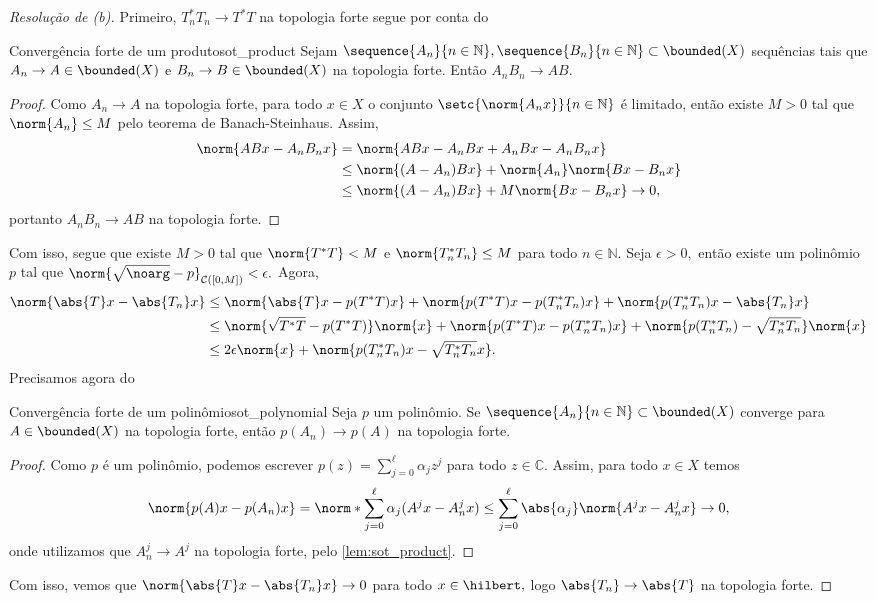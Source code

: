 \begin{proof}[Resolução de (b)]
  Primeiro, \(T_n^*T_n \to T^*T\) na topologia forte segue por conta do
  \begin{lemma}{Convergência forte de um produto}{sot_product}
    Sejam \(\sequence{A_n}{n\in\mathbb{N}}, \sequence{B_n}{n\in\mathbb{N}} \subset \bounded(X)\) sequências tais que \(A_n \to A \in \bounded(X)\) e \(B_n \to B\in\bounded(X)\) na topologia forte. Então \(A_nB_n \to AB.\)
  \end{lemma}
  \begin{proof}
    Como \(A_n\to A\) na topologia forte, para todo \(x \in X\) o conjunto \(\setc{\norm{A_nx}}{n\in\mathbb{N}}\) é limitado, então existe \(M > 0\) tal que \(\norm{A_n} \leq M\) pelo teorema de Banach-Steinhaus. Assim,
    \begin{align*}
      \norm{ABx - A_nB_nx} &= \norm{ABx - A_nBx + A_nBx - A_nB_nx}\\
                           &\leq \norm{(A-A_n)Bx} + \norm{A_n}\norm{Bx - B_nx}\\
                           &\leq \norm{(A-A_n)Bx} + M \norm{Bx - B_nx} \to 0,
    \end{align*}
    portanto \(A_nB_n \to AB\) na topologia forte.
  \end{proof}
  Com isso, segue que existe \(M > 0\) tal que \(\norm{T^*T} < M\) e \(\norm{T_n^*T_n} \leq M\) para todo \(n \in \mathbb{N}\). Seja \(\epsilon > 0,\) então existe um polinômio \(p\) tal que \(\norm{\sqrt{\noarg} - p}_{\mathcal{C}([0,M])} < \epsilon.\) Agora,
  \begin{align*}
    \norm{\abs{T}x - \abs{T_n}x} &\leq \norm{\abs{T}x - p(T^*T)x} + \norm{p(T^*T)x - p(T_n^*T_n)x} + \norm{p(T_n^*T_n)x - \abs{T_n}x}\\
                                 &\leq \norm{\sqrt{T^*T} - p(T^*T)}\norm{x} + \norm{p(T^*T)x - p(T_n^*T_n)x} + \norm{p(T_n^*T_n) - \sqrt{T_n^*T_n}}\norm{x}\\
                                 &\leq 2\epsilon \norm{x} + \norm{p(T_n^*T_n)x - \sqrt{T_n^*T_n}x}.
  \end{align*}
  Precisamos agora do
  \begin{lemma}{Convergência forte de um polinômio}{sot_polynomial}
    Seja \(p\) um polinômio. Se \(\sequence{A_n}{n\in\mathbb{N}} \subset \bounded(X)\) converge para \(A \in \bounded(X)\) na topologia forte, então \(p(A_n) \to p(A)\) na topologia forte.
  \end{lemma}
  \begin{proof}
    Como \(p\) é um polinômio, podemos escrever \(p(z) = \sum_{j = 0}^\ell \alpha_jz^j\) para todo \(z \in \mathbb{C}.\) Assim, para todo \(x \in X\) temos
    \begin{equation*}
      \norm{p(A)x - p(A_n)x} = \norm*{\sum_{j = 0}^\ell \alpha_j (A^jx - A_n^jx)} \leq \sum_{j = 0}^\ell \abs{\alpha_j} \norm{A^j x - A_n^jx} \to 0,
    \end{equation*}
    onde utilizamos que \(A_n^j\to A^j\) na topologia forte, pelo \cref{lem:sot_product}.
  \end{proof}
  Com isso, vemos que \(\norm{\abs{T}x - \abs{T_n}x} \to 0\) para todo \(x \in \hilbert,\) logo \(\abs{T_n} \to \abs{T}\) na topologia forte.
\end{proof}
